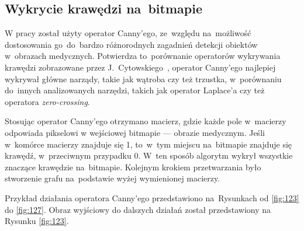 \documentclass[a4paper,11pt,twoside,openright]{report}
\theoremstyle{definition}
\begin{document}
\subsection {Wykrycie krawędzi na~bitmapie}

W pracy został użyty operator Canny'ego, ze~względu na~możliwość dostosowania
go~do~bardzo różnorodnych zagadnień detekcji obiektów w~obrazach medycznych.
Potwierdza to~porównanie operatorów wykrywania krawędzi zobrazowane przez
J.~Cytowskiego~\cite{Cyfrowe przetwarzanie obrazów medycznych}, operator Canny'ego
najlepiej wykrywał główne narządy, takie jak wątroba czy też trzustka, w~porównaniu
do~innych analizowanych narzędzi, takich jak operator Laplace'a czy też operatora \textit{zero-crossing}.

Stosując operator Canny'ego otrzymano macierz, gdzie każde pole w~macierzy odpowiada pikselowi
w wejściowej bitmapie --- obrazie medycznym. Jeśli w~komórce macierzy znajduje
się 1, to~w~tym miejscu na~bitmapie znajduje się krawędź, w~przeciwnym przypadku
0. W~ten sposób algorytm wykrył wszystkie znaczące krawędzie na~bitmapie. Kolejnym
krokiem przetwarzania było stworzenie grafu na~podstawie wyżej wymienionej macierzy.

Przykład działania operatora Canny'ego przedstawiono na~Rysunkach od \ref{fig:123} do \ref{fig:127}.
Obraz wyjściowy do dalszych działań został przedstawiony na Rysunku \ref{fig:123}.
\end{document}
